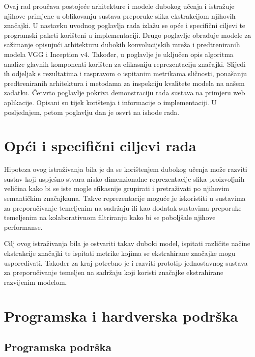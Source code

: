 \documentclass[times, utf8, proizvoljni, numeric]{fer}
\begin{document}
Ovaj rad proučava postojeće arhitekture i modele dubokog učenja i istražuje njihove primjene u oblikovanju sustava preporuke slika ekstrakcijom njihovih značajki. U nastavku uvodnog poglavlja rada izlažu se opće i specifični ciljevi te programski paketi korišteni u implementaciji. Drugo poglavlje obrađuje modele za sažimanje opisujući arhitekturu dubokih konvolucijskih mreža i predtreniranih modela VGG i Inception v4. Također, u poglavlje je uključen opis algoritma analize glavnih komponenti korišten za efikasniju reprezentaciju značajki. Slijedi ih odjeljak s rezultatima i raspravom o ispitanim metrikama sličnosti, ponašanju predtreniranih arhitektura i metodama za inspekciju kvalitete modela na našem zadatku. Četvrto poglavlje pokriva demonstraciju rada sustava na primjeru web aplikacije. Opisani su tijek korištenja i informacije o implementaciji. U posljednjem, petom poglavlju dan je osvrt na ishode rada.
 


\section{Opći i specifični ciljevi rada}

Hipoteza ovog istraživanja bila je da se korištenjem dubokog učenja može razviti sustav koji uspješno stvara nisko dimenzionalne reprezentacije slika proizvoljnih veličina kako bi se iste mogle efikasnije grupirati i pretraživati po njihovim semantičkim značajkama. Takve reprezentacije moguće je iskoristiti u sustavima za preporučivanje temeljenim na sadržaju ili kao dodatak sustavima preporuke temeljenim na kolaborativnom filtriranju kako bi se poboljšale njihove performanse.

Cilj ovog istraživanja bila je ostvariti takav duboki model, ispitati različite načine ekstrakcije značajki te ispitati metrike kojima se ekstrahirane značajke mogu uspoređivati. Također za kraj potrebno je i razviti prototip jednostavnog sustava za preporučivanje temeljen na sadržaju koji koristi značajke ekstrahirane razvijenim modelom.

\section{Programska i hardverska podrška}
\subsection{Programska podrška}
\end{document}
